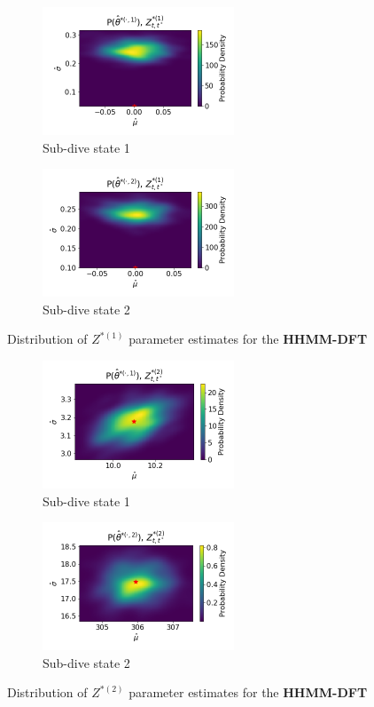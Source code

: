 \documentclass[12pt]{TD-CJS}
\begin{document}
\begin{figure}[ht]
	\centering
	\begin{subfigure}[t]{0.45\textwidth}
        \centering
        \includegraphics[width=2.25in]{../Plots/hhmm_FV_uncorr_MLE_density_A_0_0.png}
        \caption{Sub-dive state 1}
    \end{subfigure}
    \begin{subfigure}[t]{0.45\textwidth}
        \centering
        \includegraphics[width=2.25in]{../Plots/hhmm_FV_uncorr_MLE_density_A_0_1.png}
        \caption{Sub-dive state 2}
    \end{subfigure}
    \caption{Distribution of $Z^{*(1)}$ parameter estimates for the \textbf{HHMM-DFT}}
\end{figure}

\begin{figure}[ht]
	\centering
	\begin{subfigure}[t]{0.45\textwidth}
        \centering
        \includegraphics[width=2.25in]{../Plots/hhmm_FV_uncorr_MLE_density_FoVeDBA_0_0.png}
        \caption{Sub-dive state 1}
    \end{subfigure}
    \begin{subfigure}[t]{0.45\textwidth}
        \centering
        \includegraphics[width=2.25in]{../Plots/hhmm_FV_uncorr_MLE_density_FoVeDBA_0_1.png}
        \caption{Sub-dive state 2}
    \end{subfigure}
    \caption{Distribution of $Z^{*(2)}$ parameter estimates for the \textbf{HHMM-DFT}}
\end{figure}
\end{document}
